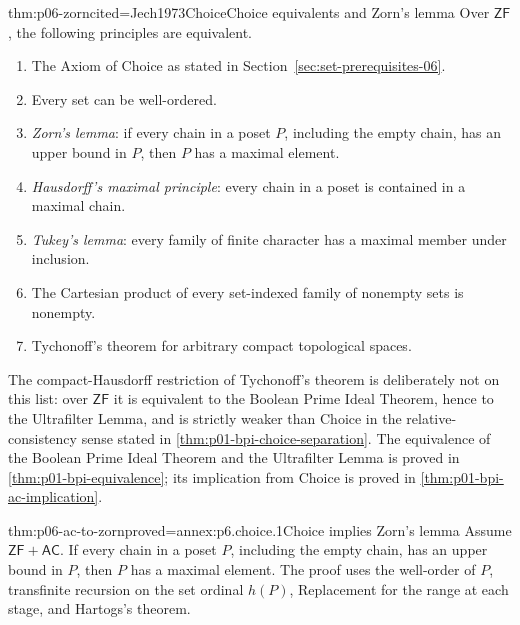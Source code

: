 \begin{hbtheorem}{thm:p06-zorn}{cited=Jech1973Choice}{Choice equivalents and Zorn's lemma}
Over \(\mathsf{ZF}\), the following principles are equivalent.
\begin{enumerate}
  \item The Axiom of Choice as stated in
        Section~\ref{sec:set-prerequisites-06}.
  \item Every set can be well-ordered.
  \item \emph{Zorn's lemma}: if every chain in a poset \(P\), including the
        empty chain, has an upper bound in \(P\), then \(P\) has a maximal
        element.
  \item \emph{Hausdorff's maximal principle}: every chain in a poset is
        contained in a maximal chain.
  \item \emph{Tukey's lemma}: every family of finite character has a maximal
        member under inclusion.
  \item The Cartesian product of every set-indexed family of nonempty sets is
        nonempty.
  \item Tychonoff's theorem for arbitrary compact topological spaces.
\end{enumerate}
The compact-Hausdorff restriction of Tychonoff's theorem is deliberately not
on this list: over \(\mathsf{ZF}\) it is equivalent to the Boolean Prime Ideal
Theorem, hence to the Ultrafilter Lemma, and is strictly weaker than Choice in
the relative-consistency sense stated in
\cref{thm:p01-bpi-choice-separation}.  The equivalence of the Boolean Prime
Ideal Theorem and the Ultrafilter Lemma is proved in
\cref{thm:p01-bpi-equivalence}; its implication from Choice is proved in
\cref{thm:p01-bpi-ac-implication}.
\end{hbtheorem}

\begin{hbtheorem}{thm:p06-ac-to-zorn}{proved=annex:p6.choice.1}{Choice implies Zorn's lemma}
Assume \(\mathsf{ZF}+\mathsf{AC}\).  If every chain in a poset \(P\),
including the empty chain, has an upper bound in \(P\), then \(P\) has a
maximal element.  The proof uses the well-order of \(P\), transfinite
recursion on the set ordinal \(h(P)\), Replacement for the range at each
stage, and Hartogs's theorem.
\end{hbtheorem}


